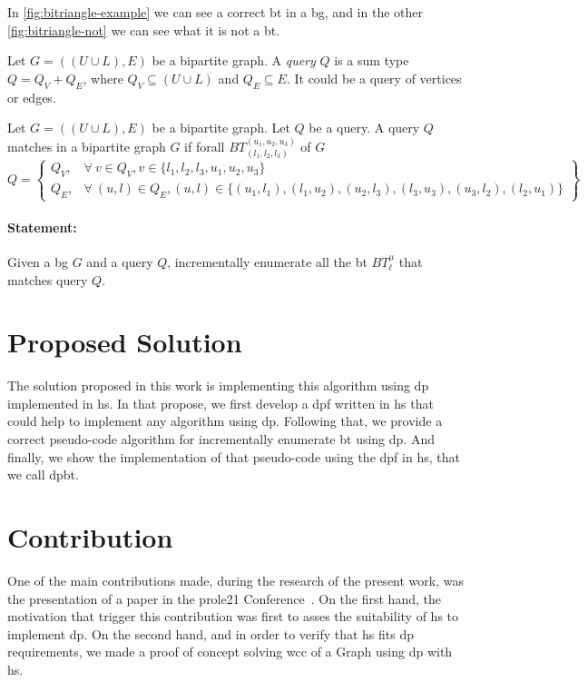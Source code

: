 

In \autoref{fig:bitriangle-example} we can see a correct \acrshort{bt} in a \acrshort{bg}, and in the other \autoref{fig:bitriangle-not} we can see what it is not a \acrshort{bt}.

\begin{definition}[Query]
Let $G=((U\cup L),E)$ be a bipartite graph. 
A \textit{query} $Q$ is a sum type $Q = Q_V + Q_E$, where $Q_V \subseteq (U \cup L)$ and $Q_E \subseteq E$. 
It could be a query of vertices or edges.
\end{definition}

\begin{definition}
  Let $G=((U\cup L),E)$ be a bipartite graph.
  Let $Q$ be a query.
  A query $Q$ matches in a bipartite graph $G$ if forall $BT_{(l_1,l_2,l_3)}^{(u_1,u_2,u_3)}$ of $G$
  \[
    Q = \left\{\begin{array}{lr}
      Q_V, & \forall\ v \in Q_V, v \in \{l_1,l_2,l_3,u_1,u_2,u_3\}\\
      Q_E, & \forall\ (u,l) \in Q_E, (u,l) \in \{(u_1, l_1), (l_1,u_2), (u_2, l_3), (l_3,u_3), (u_3, l_2), (l_2,u_1)\} 
      \end{array}\right\} 
  \]
  \end{definition}
  
\paragraph{Statement:}Given a \acrlong{bg} $G$ and a query $Q$, incrementally enumerate all the \acrlong{bt} $BT_{\ell}^{\mu}$ that matches query $Q$.

\section{Proposed Solution}
The solution proposed in this work is implementing this algorithm using \acrfull{dp} implemented in \acrfull{hs}.
In that propose, we first develop a \acrlong{dpf} written in \acrlong{hs} that could help to implement any algorithm using \acrshort{dp}.
Following that, we provide a correct pseudo-code algorithm for incrementally enumerate \acrshort{bt} using \acrshort{dp}. And finally, we  
show the implementation of that pseudo-code using the \acrshort{dpf} in \acrshort{hs}, that we call \acrfull{dpbt}.

\section{Contribution}\label{sec:contrib}
One of the main contributions made, during the research of the present work, was the presentation of a paper in the \acrfull{prole21} Conference~\cite{prole21}. 
On the first hand, the motivation that trigger this contribution was first to asses the suitability of \acrshort{hs} to implement \acrshort{dp}. 
On the second hand, and in order to verify that \acrshort{hs} fits \acrshort{dp} requirements, we made a proof of concept solving \acrfull{wcc} of a Graph 
using \acrshort{dp} with \acrshort{hs}.

